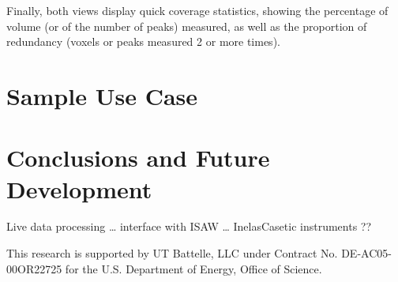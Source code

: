 \documentclass{iucr}              %
\begin{document}
Finally, both views display quick coverage statistics, showing the percentage of
volume (or of the number of peaks) measured, as well as the proportion of
redundancy (voxels or peaks measured 2 or more times).     

\section{Sample Use Case}


\section{Conclusions and Future Development}


Live data processing    …  interface with ISAW … InelasCasetic instruments ??

























This research is supported by UT Battelle, LLC under Contract No.
DE-AC05-00OR22725 for the U.S. Department of Energy, Office of Science.



     
   
\end{document}
